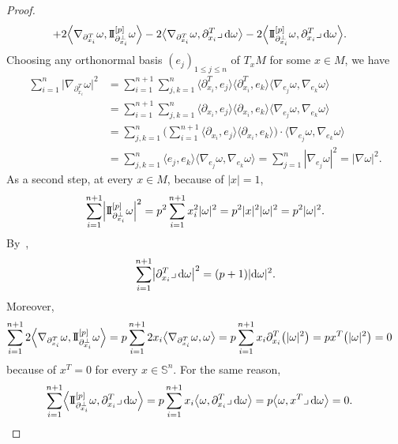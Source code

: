 \documentclass[10pt,a4paper]{amsart}
\numberwithin{equation}{section}
\theoremstyle{definition}
\begin{document}
\begin{proof}
\begin{align*}
&{}{+2}\Bigl\langle\nabla_{\partial_{x_i}^T}\omega,\mathrm{I\!I}_{\partial^\perp_{x_i}}^{[p]}\omega\Bigr\rangle-2\bigl\langle \nabla_{\partial_{x_i}^T}\omega,\partial_{x_i}^T\lrcorner\,{\rm d}\omega\bigr\rangle-2\Bigl\langle\mathrm{I\!I}_{\partial^\perp_{x_i}}^{[p]}\omega,\partial_{x_i}^T\lrcorner\,{\rm d}\omega\Bigr\rangle.
\end{align*}
Choosing any or\-tho\-nor\-mal basis $(e_j)_{1\leq j\leq n}$ of $T_x M$ for some $x\in M$, we have
\begin{align*}
\sum_{i=1}^n\bigl|\nabla_{\partial_{x_i}^T}\omega\bigr|^2&=\sum_{i=1}^{n+1}\sum_{j,k=1}^n\bigl\langle\partial^T_{ x_i},e_j\bigr\rangle\bigl\langle\partial^T_{ x_i},e_k\bigr\rangle\langle\nabla_{e_j}\omega,\nabla_{e_k}\omega\rangle\\
&=\sum_{i=1}^{n+1}\sum_{j,k=1}^n\langle\partial_{ x_i},e_j\rangle\langle\partial_{ x_i},e_k\rangle\langle\nabla_{e_j}\omega,\nabla_{e_k}\omega\rangle\\
&=\sum_{j,k=1}^n\Biggl(\sum_{i=1}^{n+1}\langle\partial_{ x_i},e_j\rangle\langle\partial_{ x_i},e_k\rangle\Biggr)\cdot\langle\nabla_{e_j}\omega,\nabla_{e_k}\omega\rangle\\
&=\sum_{j,k=1}^n\langle e_j,e_k\rangle\langle\nabla_{e_j}\omega,\nabla_{e_k}\omega\rangle
=\sum_{j=1}^n|\nabla_{e_j}\omega|^2
=|\nabla\omega|^2.
\end{align*}
As a second step, at every $x\in M$, because of $|x|=1$,
\[\sum_{i=1}^{n+1}\Bigl|\mathrm{I\!I}_{\partial^\perp_{x_i}}^{[p]}\omega\Bigr|^2=p^2\sum_{i=1}^{n+1}x_i^2|\omega|^2=p^2|x|^2|\omega|^2=p^2|\omega|^2.\]
By~\cite[equation~(22)]{EGHM},
\[\sum_{i=1}^{n+1}\bigl|\partial_{x_i}^T\lrcorner\,{\rm d}\omega\bigr|^2=(p+1)|{\rm d}\omega|^2.\]
Moreover,
\begin{align*}
\sum_{i=1}^{n+1}2\Bigl\langle\nabla_{\partial_{x_i}^T}\omega,\mathrm{I\!I}_{\partial^\perp_{x_i}}^{[p]}\omega\Bigr\rangle& =p\sum_{i=1}^{n+1}2x_i\bigl\langle\nabla_{\partial_{x_i}^T}\omega,\omega\bigr\rangle
=p\sum_{i=1}^{n+1}x_i\partial_{x_i}^T\bigl(|\omega|^2\bigr)
=px^T\bigl(|\omega|^2\bigr)
=0
\end{align*}
because of $x^T=0$ for every $x\in\mathbb{S}^n$.
For the same reason,
\begin{align*}
\sum_{i=1}^{n+1}\Bigl\langle\mathrm{I\!I}_{\partial^\perp_{x_i}}^{[p]}\omega,\partial_{x_i}^T\lrcorner\,{\rm d}\omega\Bigr\rangle&=p\sum_{i=1}^{n+1}x_i\bigl\langle\omega,\partial_{x_i}^T\lrcorner\,{\rm d}\omega\bigr\rangle
=p\bigl\langle\omega,x^T\lrcorner\,{\rm d}\omega\bigr\rangle
=0.
\end{align*}

\end{proof}
\end{document}
